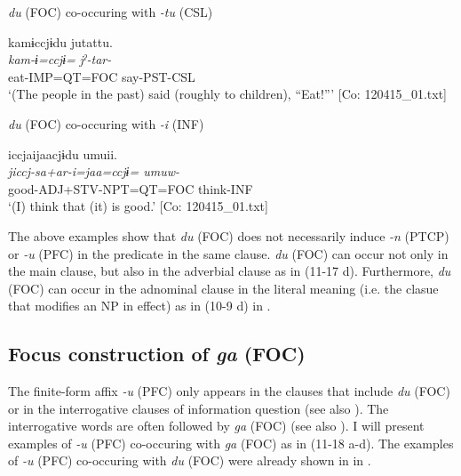   \ex \textit{du} (FOC) co-occuring with \textit{{}-tu} (CSL)

  
      \glll    kamɨccjɨdu  jutattu.\\
    \textit{kam-ɨ=ccjɨ=}  \textit{jˀ-tar-}\\
    eat-IMP=QT=FOC  say-PST-CSL\\
\glt     ‘(The people in the past) said (roughly to children), “Eat!”’ [Co: 120415\_01.txt]

  \ex \textit{du} (FOC) co-occuring with \textit{{}-i} (INF)

  
      \glll    iccjaijaacjɨdu  umuii.\\
    \textit{jiccj}\footnotemark[2]{}\textit{{}-sa+ar-i=jaa=ccjɨ=  umuw-}\\
    good-ADJ+STV-NPT=QT=FOC  think-INF\\
    \glt     ‘(I) think that (it) is good.’ [Co: 120415\_01.txt]
\z
\z
{}

The above examples show that \textit{du} (FOC) does not necessarily induce \textit{{}-n} (PTCP) or \textit{{}-u} (PFC) in the predicate in the same clause. \textit{du} (FOC) can occur not only in the main clause, but also in the adverbial clause as in (11-17 d). Furthermore, \textit{du} (FOC) can occur in the adnominal clause in the literal meaning (i.e. the clasue that modifies an NP in effect) as in (10-9 d) in .

\subsection{Focus construction of \textit{ga} (FOC)}\label{sec:11.3.2}

The finite-form affix \textit{{}-u} (PFC) only appears in the clauses that include \textit{du} (FOC) or in the interrogative clauses of information question (see also ). The interrogative words are often followed by \textit{ga} (FOC) (see also ). I will present examples of \textit{{}-u} (PFC) co-occuring with \textit{ga} (FOC) as in (11-18 a-d). The examples of \textit{-u} (PFC) co-occuring with \textit{du} (FOC) were already shown in  in .

